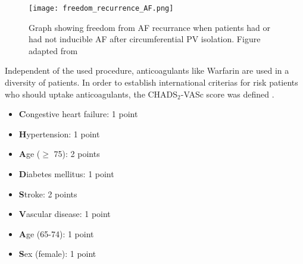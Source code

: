 \documentclass[type=dr, dr=rernat, accentcolor=tud7b,colorbacktitle, bigchapter, openright, twoside, 12pt ]{tudthesis}
\begin{document}

\begin{figure}[H]
\begin{center}
\texttt{[image: freedom\_recurrence\_AF.png]}
\caption{Graph showing freedom from AF recurrance when patients had or had not inducible AF after circumferential PV isolation. Figure adapted 
from \cite{Ora04}}
\label{freedom_recurrence}
\end{center}
\end{figure}



\newpage

Independent of the used procedure, anticoagulants like Warfarin are used in a diversity of patients. In order to establish international 
criterias for risk patients who should uptake anticoagulants, the CHADS$_{2}$-VASc score was defined \cite{ESC12}.

\begin{itemize}
 \item [] \textbf{C}ongestive heart failure: 1 point
 \item [] \textbf{H}ypertension: 1 point
 \item [] \textbf{A}ge ($\geq$ 75): 2 points
 \item [] \textbf{D}iabetes mellitus: 1 point
 \item [] \textbf{S}troke: 2 points
 \item [] \textbf{V}ascular disease: 1 point
 \item [] \textbf{A}ge (65-74): 1 point
 \item [] \textbf{S}ex (female): 1 point
\end{itemize}
\end{document}
